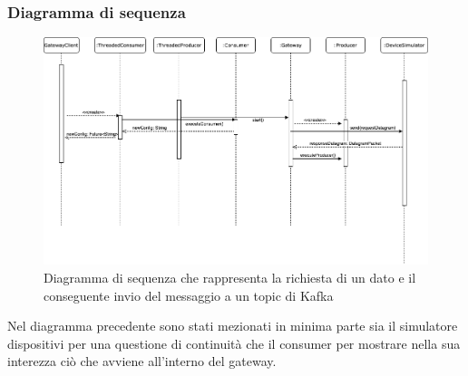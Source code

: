 			\begin{landscape}
			\subsubsection{Diagramma di sequenza}
		  	\begin{figure}[H]
				\centering
				\includegraphics[scale=0.500]{res/images/GATEWAY/RichiestaInvioGateway.png}
				\caption{Diagramma di sequenza che rappresenta la richiesta di un dato e il conseguente invio del messaggio a un topic di Kafka}
			\end{figure}
			
			Nel diagramma precedente sono stati mezionati in minima parte sia il simulatore dispositivi per una questione di continuità che il consumer per mostrare nella sua interezza ciò che avviene all'interno del gateway.

			\end{landscape}








